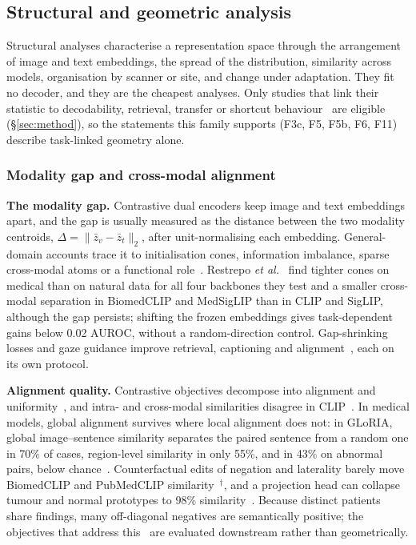 \subsection{Structural and geometric analysis}
\label{sec:geometry}

Structural analyses characterise a representation space through the arrangement of image and text
embeddings, the spread of the distribution, similarity across models, organisation by scanner or site,
and change under adaptation. They fit no decoder, and they are the cheapest analyses. Only studies that link their statistic to
decodability, retrieval, transfer or shortcut behaviour~\cite{geirhos2020shortcut} are eligible
(\S\ref{sec:method}), so the statements this family supports (F3c, F5, F5b, F6, F11) describe
task-linked geometry alone.

\subsubsection{Modality gap and cross-modal alignment}

\textbf{The modality gap.} Contrastive dual encoders keep image and text embeddings apart, and the gap
is usually measured as the distance between the two modality centroids,
$\Delta=\|\bar z_v-\bar z_t\|_2$, after unit-normalising each embedding. General-domain accounts trace
it to initialisation cones, information imbalance, sparse cross-modal atoms or a functional
role~\cite{liang2022mind,schrodi2025two,dhimoila2026crossmodal,yan2025beyond}. Restrepo \emph{et
al.}~\cite{restrepo2026cone} find tighter cones on medical than on natural data for all four backbones
they test and a smaller cross-modal separation in BiomedCLIP and MedSigLIP than in CLIP and SigLIP,
although the gap persists; shifting the frozen embeddings gives task-dependent gains below 0.02 AUROC,
without a random-direction control. Gap-shrinking losses and gaze guidance improve retrieval, captioning
and alignment~\cite{grassucci2025closing,lahmar2026bridging,kumar2024improving}, each on its own protocol.

\textbf{Alignment quality.} Contrastive objectives decompose into alignment and
uniformity~\cite{wang2020understanding}, and intra- and cross-modal similarities disagree in
CLIP~\cite{mistretta2025cross}. In medical models, global alignment survives where local alignment does
not: in GLoRIA, global image--sentence similarity separates the paired sentence from a random one in
70\% of cases, region-level similarity in only 55\%, and in 43\% on abnormal pairs, below
chance~\cite{mcinerney2022that}. Counterfactual edits of negation and laterality barely move BiomedCLIP
and PubMedCLIP similarity~\cite{balogh2026regularization}$^{\dagger}$, and a projection head can collapse
tumour and normal prototypes to 98\% similarity~\cite{arora2026semantic}. Because distinct patients
share findings, many off-diagonal negatives are semantically positive; the objectives that address
this~\cite{wang2022medclip,park2025off,zhang2025fane,ztrk2025meta} are evaluated downstream rather than
geometrically.

